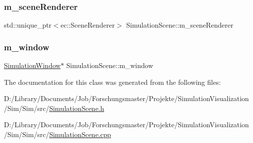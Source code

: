 \mbox{\label{class_simulation_scene_a97b314741c8056ae2168f8084926003a}} 
\subsubsection{\texorpdfstring{m\+\_\+scene\+Renderer}{m\_sceneRenderer}}
{\footnotesize\ttfamily std\+::unique\+\_\+ptr$<$ec\+::\+Scene\+Renderer$>$ Simulation\+Scene\+::m\+\_\+scene\+Renderer\hspace{0.3cm}{\ttfamily [protected]}}

\mbox{\label{class_simulation_scene_a704310f4a3436f746afcc197b0893302}} 
\subsubsection{\texorpdfstring{m\+\_\+window}{m\_window}}
{\footnotesize\ttfamily \mbox{\hyperlink{class_simulation_window}{Simulation\+Window}}$\ast$ Simulation\+Scene\+::m\+\_\+window\hspace{0.3cm}{\ttfamily [protected]}}



The documentation for this class was generated from the following files\+:\begin{DoxyCompactItemize}
\item 
D\+:/\+Library/\+Documents/\+Job/\+Forschungsmaster/\+Projekte/\+Simulation\+Visualization/\+Sim/\+Sim/src/\mbox{\hyperlink{_simulation_scene_8h}{Simulation\+Scene.\+h}}\item 
D\+:/\+Library/\+Documents/\+Job/\+Forschungsmaster/\+Projekte/\+Simulation\+Visualization/\+Sim/\+Sim/src/\mbox{\hyperlink{_simulation_scene_8cpp}{Simulation\+Scene.\+cpp}}\end{DoxyCompactItemize}
